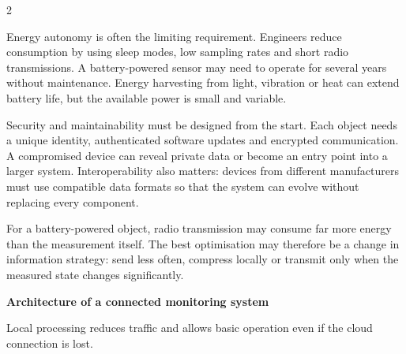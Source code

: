 \begin{multicols}{2}
\begin{ecarticle}
Energy autonomy is often the limiting requirement. Engineers reduce consumption by using sleep modes,
low sampling rates and short radio transmissions. A battery-powered sensor may need to operate for
several years without maintenance. Energy harvesting from light, vibration or heat can extend battery
life, but the available power is small and variable.

Security and maintainability must be designed from the start. Each object needs a unique identity,
authenticated software updates and encrypted communication. A compromised device can reveal private
data or become an entry point into a larger system. Interoperability also matters: devices from
different manufacturers must use compatible data formats so that the system can evolve without
replacing every component.
\end{ecarticle}

\begin{tcolorbox}[title=\sffamily\bfseries Engineering Insight,colback=yellow!10,colframe=ECOrange]
For a battery-powered object, radio transmission may consume far more energy than the measurement
itself. The best optimisation may therefore be a change in information strategy: send less often,
compress locally or transmit only when the measured state changes significantly.
\end{tcolorbox}

\begin{engineeringfocus}
\textbf{Architecture of a connected monitoring system}
\begin{center}
\end{center}
Local processing reduces traffic and allows basic operation even if the cloud connection is lost.
\end{engineeringfocus}


\end{multicols}
